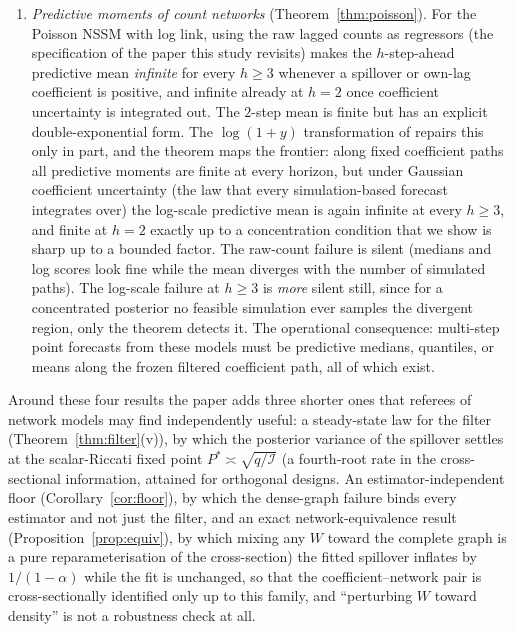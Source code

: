 \documentclass[12pt]{article}
\theoremstyle{plain}
\theoremstyle{definition}
\theoremstyle{remark}
\newcommand{\calI}{\mathcal{I}}
\begin{document}
\begin{enumerate}[leftmargin=*,itemsep=1pt]
\item \emph{Predictive moments of count networks} (Theorem~\ref{thm:poisson}). For the Poisson NSSM with log link, using the raw lagged counts as regressors (the specification of the paper this study revisits) makes the $h$-step-ahead predictive mean \emph{infinite} for every $h\ge 3$ whenever a spillover or own-lag coefficient is positive, and infinite already at $h=2$ once coefficient uncertainty is integrated out. The $2$-step mean is finite but has an explicit double-exponential form. The $\log(1+y)$ transformation of \citet{fokianos2011log} repairs this only in part, and the theorem maps the frontier: along fixed coefficient paths all predictive moments are finite at every horizon, but under Gaussian coefficient uncertainty (the law that every simulation-based forecast integrates over) the log-scale predictive mean is again infinite at every $h\ge3$, and finite at $h=2$ exactly up to a concentration condition that we show is sharp up to a bounded factor. The raw-count failure is silent (medians and log scores look fine while the mean diverges with the number of simulated paths). The log-scale failure at $h\ge3$ is \emph{more} silent still, since for a concentrated posterior no feasible simulation ever samples the divergent region, only the theorem detects it. The operational consequence: multi-step point forecasts from these models must be predictive medians, quantiles, or means along the frozen filtered coefficient path, all of which exist.
\end{enumerate}

Around these four results the paper adds three shorter ones that referees of network models may find independently useful: a steady-state law for the filter (Theorem~\ref{thm:filter}(v)), by which the posterior variance of the spillover settles at the scalar-Riccati fixed point $P^\ast\asymp\sqrt{q/\calI}$ (a fourth-root rate in the cross-sectional information, attained for orthogonal designs. An estimator-independent floor (Corollary~\ref{cor:floor}), by which the dense-graph failure binds every estimator and not just the filter, and an exact network-equivalence result (Proposition~\ref{prop:equiv}), by which mixing any $W$ toward the complete graph is a pure reparameterisation of the cross-section) the fitted spillover inflates by $1/(1-\alpha)$ while the fit is unchanged, so that the coefficient--network pair is cross-sectionally identified only up to this family, and ``perturbing $W$ toward density'' is not a robustness check at all.
\end{document}
